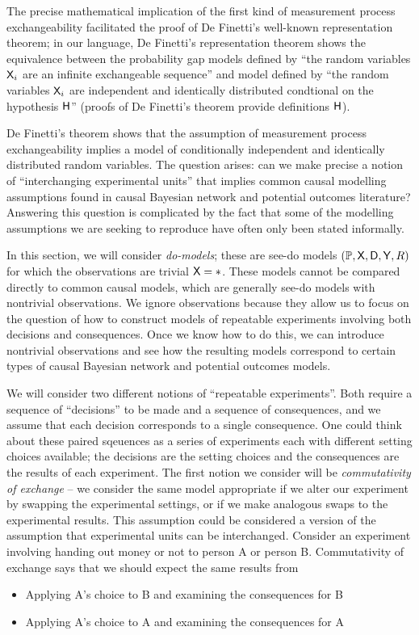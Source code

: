 The precise mathematical implication of the first kind of measurement process exchangeability facilitated the proof of De Finetti's well-known representation theorem; in our language, De Finetti's representation theorem shows the equivalence between the probability gap models defined by ``the random variables $\mathsf{X}_i$ are an infinite exchangeable sequence'' and model defined by ``the random variables $\mathsf{X}_i$ are independent and identically distributed condtional on the hypothesis $\mathsf{H}$'' (proofs of De Finetti's theorem provide definitions $\mathsf{H}$).

De Finetti's theorem shows that the assumption of measurement process exchangeability implies a model of conditionally independent and identically distributed random variables. The question arises: can we make precise a notion of ``interchanging experimental units'' that implies common causal modelling assumptions found in causal Bayesian network and potential outcomes literature? Answering this question is complicated by the fact that some of the modelling assumptions we are seeking to reproduce have often only been stated informally.

In this section, we will consider \emph{do-models}; these are see-do models $(\mathbb{P},\mathsf{X},\mathsf{D},\mathsf{Y},R)$ for which the observations are trivial $\mathsf{X}=*$. These models cannot be compared directly to common causal models, which are generally see-do models with nontrivial observations. We ignore observations because they allow us to focus on the question of how to construct models of repeatable experiments involving both decisions and consequences. Once we know how to do this, we can introduce nontrivial observations and see how the resulting models correspond to certain types of causal Bayesian network and potential outcomes models.

We will consider two different notions of ``repeatable experiments''. Both require a sequence of ``decisions'' to be made and a sequence of consequences, and we assume that each decision corresponds to a single consequence. One could think about these paired sqeuences as a series of experiments each with different setting choices available; the decisions are the setting choices and the consequences are the results of each experiment. The first notion we consider will be \emph{commutativity of exchange} -- we consider the same model appropriate if we alter our experiment by swapping the experimental settings, or if we make analogous swaps to the experimental results. This assumption could be considered a version of the assumption that experimental units can be interchanged. Consider an experiment involving handing out money or not to person A or person B. Commutativity of exchange says that we should expect the same results from 
\begin{itemize}
    \item Applying A's choice to B and examining the consequences for B
    \item Applying A's choice to A and examining the consequences for A
\end{itemize}

